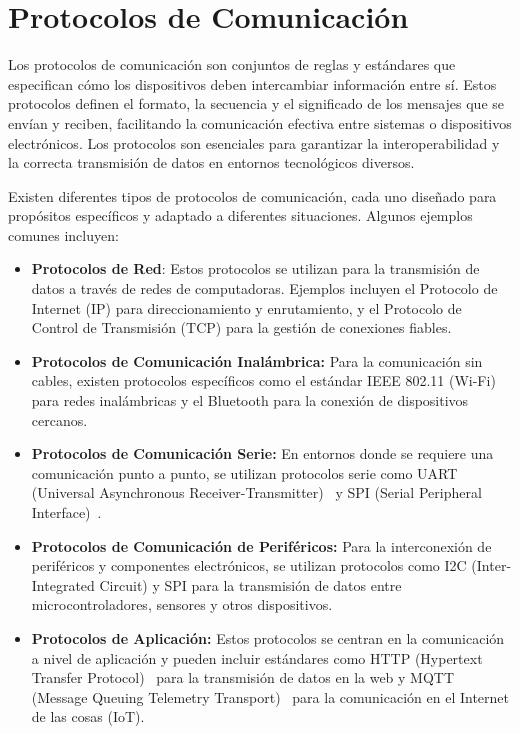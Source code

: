 \section{Protocolos de Comunicación}
Los protocolos de comunicación son conjuntos de reglas y estándares que especifican cómo los dispositivos deben intercambiar información entre sí. Estos protocolos definen el formato, la secuencia y el significado de los mensajes que se envían y reciben, facilitando la comunicación efectiva entre sistemas o dispositivos electrónicos. Los protocolos son esenciales para garantizar la interoperabilidad y la correcta transmisión de datos en entornos tecnológicos diversos.

Existen diferentes tipos de protocolos de comunicación, cada uno diseñado para propósitos específicos y adaptado a diferentes situaciones. Algunos ejemplos comunes incluyen:
\begin{itemize}
\item \textbf{Protocolos de Red}:
Estos protocolos se utilizan para la transmisión de datos a través de redes de computadoras. Ejemplos incluyen el Protocolo de Internet (IP) para direccionamiento y enrutamiento, y el Protocolo de Control de Transmisión (TCP) para la gestión de conexiones fiables.

\item \textbf{Protocolos de Comunicación Inalámbrica:}
	Para la comunicación sin cables, existen protocolos específicos como el estándar IEEE 802.11 (Wi-Fi)~\cite{manual:IEEE802.11} para redes inalámbricas y el Bluetooth para la conexión de dispositivos cercanos.

\item \textbf{Protocolos de Comunicación Serie:}
	En entornos donde se requiere una comunicación punto a punto, se utilizan protocolos serie como UART (Universal Asynchronous Receiver-Transmitter)~\cite{manual:UART} y SPI (Serial Peripheral Interface)~\cite{manual:SPI-I2C}.

\item \textbf{Protocolos de Comunicación de Periféricos:}
Para la interconexión de periféricos y componentes electrónicos, se utilizan protocolos como I2C (Inter-Integrated Circuit) y SPI para la transmisión de datos entre microcontroladores, sensores y otros dispositivos.

\item \textbf{Protocolos de Aplicación:}
	Estos protocolos se centran en la comunicación a nivel de aplicación y pueden incluir estándares como HTTP (Hypertext Transfer Protocol)~\cite{manual:HTTP} para la transmisión de datos en la web y MQTT (Message Queuing Telemetry Transport)~\cite{manual:MQTT} para la comunicación en el Internet de las cosas (IoT).
\end{itemize}

